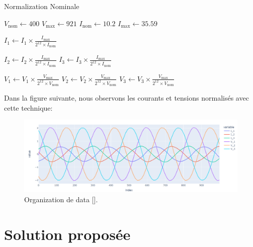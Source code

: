 \begin{algorithm}[H]
  \caption{Normalization Nominale}

  \Initialization{}

  \( V_{\text{nom}} \gets 400 \) \;
  \( V_{\text{max}} \gets 921 \) \;
  \( I_{\text{nom}} \gets 10.2 \) \;
  \( I_{\text{max}} \gets 35.59 \) \;

  \Normalization{}

  \( I_1 \gets I_1 \times \frac{I_{\text{max}}}{2^{12} \times I_{\text{nom}}} \) \;

  \( I_2 \gets I_2 \times \frac{I_{\text{max}}}{2^{12} \times I_{\text{nom}}} \) \;
  \( I_3 \gets I_3 \times \frac{I_{\text{max}}}{2^{12} \times I_{\text{nom}}} \) \;

  \( V_1 \gets V_1 \times \frac{V_{\text{max}}}{2^{12} \times V_{\text{nom}}} \) \;
  \( V_2 \gets V_2 \times \frac{V_{\text{max}}}{2^{12} \times V_{\text{nom}}} \) \;
  \( V_3 \gets V_3 \times \frac{V_{\text{max}}}{2^{12} \times V_{\text{nom}}} \) \;


\end{algorithm}
\FloatBarrier

Dans la figure suivante, nous observons les courants et tensions normalisés
avec cette technique:

\begin{figure}[hbt!]
  \centering
  \includegraphics[width=14cm]{images_pfe/normalization_nominale.png}
  \caption{Organization de data [\cite{yoon2019time}].}
  \label{fig:data_norm}
\end{figure}
\FloatBarrier

\section{Solution proposée}


